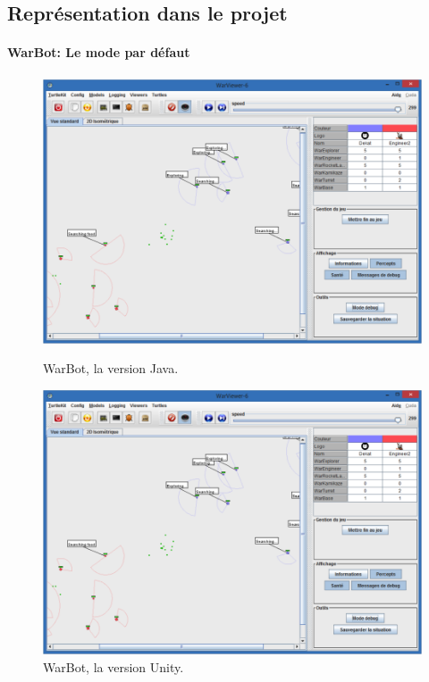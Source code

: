 \documentclass{report}
\begin{document}
\subsection{Représentation dans le projet}

\paragraph{WarBot: Le mode par défaut}
\paragraph{}
\begin{figure}[h]
    \begin{minipage}[c]{.46\linewidth}
        \centering
        \includegraphics[scale=0.45]{interface-warbot3}
        \caption{WarBot, la version Java.}
    \end{minipage}
    \hfill%
    \begin{minipage}[c]{.46\linewidth}
        \centering
        \includegraphics[scale=0.45]{interface-warbot3}
        \caption{WarBot, la version Unity.}
    \end{minipage}
\end{figure}
\end{document}
